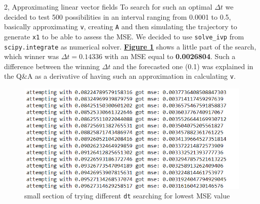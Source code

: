 \documentclass[10pt,a4paper]{article}
\begin{document}
\begin{task}{2, Approximating linear vector fields}
To search for such an optimal $\Delta t$ we decided to test 500 possibilities in an interval ranging from 0.0001 to 0.5, basically approximating \texttt{v}, creating \texttt{A} and then simulating the trajectory to generate \texttt{x1} to be able to assess the MSE. We decided to use \texttt{solve\_ivp} from \texttt{scipy.integrate} as numerical solver. \textbf{\hyperref[fig:t2-attempts]{Figure \ref{fig:t2-attempts}}} shows a little part of the search, which winner was $\Delta t = 0.14336$ with an MSE equal to \textbf{0.0026804}. Such a difference between the winning $\Delta t$ and the forecasted one (0.1) was explained in the Q&A as a derivative of having such an approximation in calculating \texttt{v}. 
\begin{figure}[H]
    \centering
    \includegraphics[scale=0.5]{images/task2_attempts.png}
    \caption{small section of trying different \texttt{dt} searching for lowest MSE value}
    \label{fig:t2-attempts}
\end{figure}

\end{task}
\end{document}
